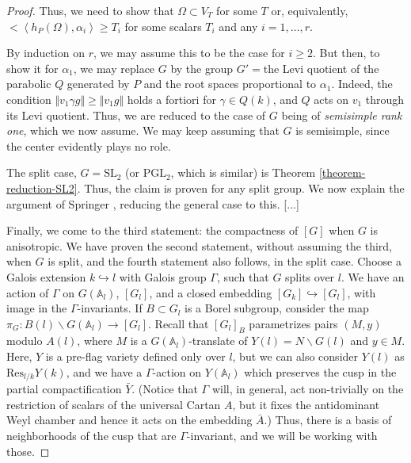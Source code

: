 \begin{proof}
 Thus, we need to show that $\Omega\subset V_T$ for some $T$ or, equivalently, $<\left < h_P(\Omega), \alpha_i\right> \ge T_i$ for some scalars $T_i$ and any $i=1,\dots ,r$. 
 
 By induction on $r$, we may assume this to be the case for $i \ge 2$. But then, to show it for $\alpha_1$, we may replace $G$ by the group $G'=$the Levi quotient of the parabolic $Q$ generated by $P$ and the root spaces proportional to $\alpha_1$. Indeed, the condition $\Vert v_1 \gamma g \Vert \ge \Vert v_1 g\Vert$ holds a fortiori for $\gamma \in Q (k)$, and $Q$ acts on $v_1$ through its Levi quotient. Thus, we are reduced to the case of $G$ being of \emph{semisimple rank one}, which we now assume. We may keep assuming that $G$ is semisimple, since the center evidently plays no role.
 
 The split case, $G = \text{SL}_2$ (or $\text{PGL}_2$, which is similar) is Theorem \ref{theorem-reduction-SL2}. Thus, the claim is proven for any split group. We now explain the argument of Springer \cite{Springer-reduction-theory}, reducing the general case to this. [...]
 
 Finally, we come to the third statement: the compactness of $[G]$ when $G$ is anisotropic. We have proven the second statement, without assuming the third, when $G$ is split, and the fourth statement also follows, in the split case. Choose a Galois extension $k\hookrightarrow l$ with Galois group $\Gamma$, such that $G$ splits over $l$. We have an action of $\Gamma$ on $G(\mathbb A_l)$, $[G_l]$, and a closed embedding $[G_k]\hookrightarrow [G_l]$, with image in the $\Gamma$-invariants. If $B\subset G_l$ is a Borel subgroup, consider the map $\pi_G: B(l)\backslash G(\mathbb A_l) \to [G_l]$.  Recall that $[G_l]_B$ parametrizes pairs $(M,y)$ modulo $A(l)$, where $M$ is a $G(\mathbb A_l)$-translate of $Y(l) = N\backslash G(l)$ and $y\in M$. Here, $Y$ is a pre-flag variety defined only over $l$, but we can also consider $Y(l)$ as $\text{Res}_{l/k} Y(k)$, and we have a $\Gamma$-action on $Y(\mathbb A_l)$ which preserves the cusp in the partial compactification $\bar Y$. (Notice that $\Gamma$ will, in general, act non-trivially on the restriction of scalars of the universal Cartan $A$, but it fixes the antidominant Weyl chamber and hence it acts on the embedding $\bar A$.) Thus, there is a basis of neighborhoods of the cusp that are $\Gamma$-invariant, and we will be working with those. 
 

\end{proof}
